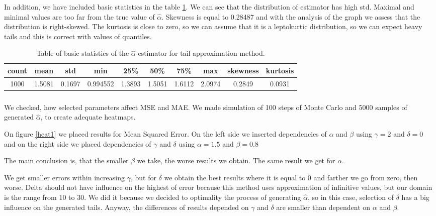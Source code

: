 \documentclass{article}
\begin{document}
        In addition, we have included basic statistics in the table \ref{tabelka1}. We can see that the distribution of estimator has high std.  Maximal and minimal values are too far from the true value of $\hat\alpha$. Skewness is equal to 0.28487 and with the analysis of the graph we assess that the distribution is right-skewed. The kurtosis is close to zero, so we can assume that it is a leptokurtic distribution, so we can expect heavy tails and this is correct with values of quantiles.		
		\begin{table}[H]
			\centering
			\begin{tabular}{|c|c|c|c|c|c|c|c|c|c|}
				\hline
				count &      mean &       std &       min &     25\% &       50\% &     75\% &      max & skewness & kurtosis \\\hline
				1000 & 1.5081 &  0.1697 &  0.994552 &  1.3893 &  1.5051 &  1.6112 &  2.0974 & 0.2849 & 0.0931\\\hline
			\end{tabular}
			\caption{Table of basic statistics of the $\hat\alpha$ estimator for tail approximation method.}\label{tabelka1}
		\end{table}
		\subsubsection{}
		We checked, how selected parameters affect MSE and MAE. We made simulation of 100 steps of Monte Carlo and 5000 samples of generated $\hat\alpha$, to create adequate heatmaps.
        
        On figure \ref{heat1} we placed results for Mean Squared Error. On the left side we inserted dependencies of $\alpha$ and $\beta$ using $\gamma=2$ and $\delta=0$ and on the right side we placed dependencies of $\gamma$ and $\delta$ using $\alpha=1.5$ and $\beta=0.8$
        
        The main conclusion is, that the smaller $\beta$ we take, the worse results we obtain. The same result we get for $\alpha$. 
        
        We get smaller errors within increasing $\gamma$, but for $\delta$ we obtain the best results where it is equal to 0 and farther we go from zero, then worse. Delta should not have influence on the highest of error because this method uses approximation of infinitive values, but our domain is the range from 10 to 30. We did it because we decided to optimality the process of generating $\hat\alpha$, so in this case, selection of $\delta$ has a big influence on the generated tails. Anyway, the differences of results depended on $\gamma$ and $\delta$ are smaller than dependent on $\alpha$ and $\beta$.
    
\end{document}
